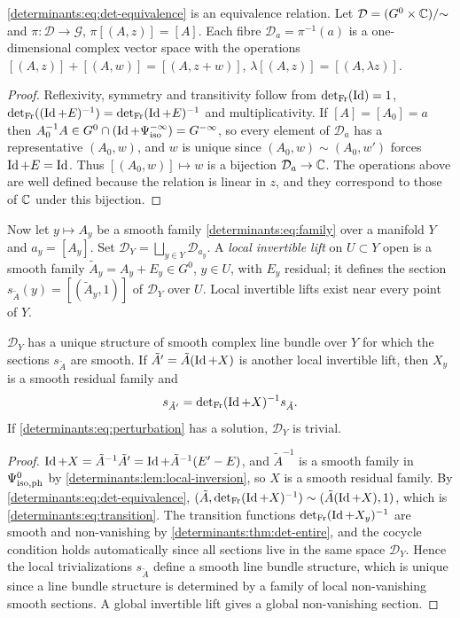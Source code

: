 \begin{lemma}\label{determinants:lem:det-line}
  \eqref{determinants:eq:det-equivalence} is an equivalence relation. Let
  $\mathcal D=(G^0\times\mathbb{C})/{\sim}$ and $\pi:\mathcal D\to\mathcal G$,
  $\pi[(A,z)]=[A]$. Each fibre $\mathcal D_a=\pi^{-1}(a)$ is a one-dimensional
  complex vector space with the operations
  $[(A,z)]+[(A,w)]=[(A,z+w)]$, $\lambda[(A,z)]=[(A,\lambda z)]$.
\end{lemma}
\begin{proof}
  Reflexivity, symmetry and transitivity follow from $\operatorname{det}_{\mathrm{Fr}}(\operatorname{Id})=1$,
  $\operatorname{det}_{\mathrm{Fr}}((\operatorname{Id}+E)^{-1})=\operatorname{det}_{\mathrm{Fr}}(\operatorname{Id}+E)^{-1}$ and multiplicativity. If
  $[A]=[A_0]=a$ then $A_0^{-1}A\in G^0\cap(\operatorname{Id}+\Psi^{-\infty}_{\mathrm{iso}})=G^{-\infty}$,
  so every element of $\mathcal D_a$ has a representative $(A_0,w)$, and $w$
  is unique since $(A_0,w)\sim(A_0,w')$ forces $\operatorname{Id}+E=\operatorname{Id}$. Thus
  $[(A_0,w)]\mapsto w$ is a bijection $\mathcal D_a\to\mathbb{C}$. The operations
  above are well defined because the relation is linear in $z$, and they
  correspond to those of $\mathbb{C}$ under this bijection.
\end{proof}

Now let $y\mapsto A_y$ be a smooth family \eqref{determinants:eq:family} over a
manifold $Y$ and $a_y=[A_y]$. Set $\mathcal D_Y=\bigsqcup_{y\in Y}\mathcal D_{a_y}$.
A \emph{local invertible lift} on $U\subset Y$ open is a smooth family
$\tilde A_y=A_y+E_y\in G^0$, $y\in U$, with $E_y$ residual; it defines the
section $s_{\tilde A}(y)=[(\tilde A_y,1)]$ of $\mathcal D_Y$ over $U$. Local
invertible lifts exist near every point of $Y$.

\begin{proposition}\label{determinants:prop:det-bundle}
  $\mathcal D_Y$ has a unique structure of smooth complex line bundle over $Y$
  for which the sections $s_{\tilde A}$ are smooth. If $\tilde A'=\tilde A(\operatorname{Id}+X)$
  is another local invertible lift, then $X_y$ is a smooth residual family and
  \begin{equation}\label{determinants:eq:transition}
    s_{\tilde A'}=\operatorname{det}_{\mathrm{Fr}}(\operatorname{Id}+X)^{-1}s_{\tilde A}.
  \end{equation}
  If \eqref{determinants:eq:perturbation} has a solution, $\mathcal D_Y$ is
  trivial.
\end{proposition}
\begin{proof}
  $\operatorname{Id}+X=\tilde A^{-1}\tilde A'=\operatorname{Id}+\tilde A^{-1}(E'-E)$, and $\tilde A^{-1}$
  is a smooth family in $\Psi^{0}_{\mathrm{iso,ph}}$ by
  \cref{determinants:lem:local-inversion}, so $X$ is a smooth residual family.
  By \eqref{determinants:eq:det-equivalence},
  $(\tilde A,\operatorname{det}_{\mathrm{Fr}}(\operatorname{Id}+X)^{-1})\sim(\tilde A(\operatorname{Id}+X),1)$, which is
  \eqref{determinants:eq:transition}. The transition functions
  $\operatorname{det}_{\mathrm{Fr}}(\operatorname{Id}+X_y)^{-1}$ are smooth and non-vanishing by
  \cref{determinants:thm:det-entire}, and the cocycle condition holds
  automatically since all sections live in the same space $\mathcal D_Y$.
  Hence the local trivializations $s_{\tilde A}$ define a smooth line bundle
  structure, which is unique since a line bundle structure is determined by
  a family of local non-vanishing smooth sections. A global invertible lift gives a global
  non-vanishing section.
\end{proof}

